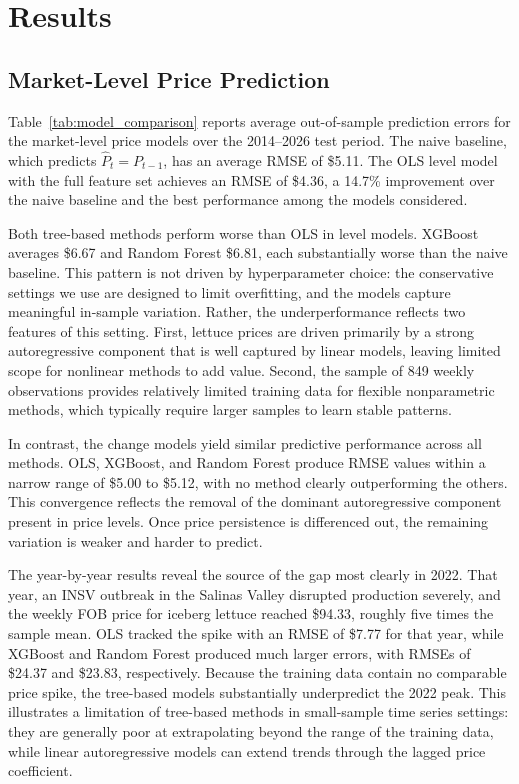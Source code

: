 \documentclass[12pt]{article}
\begin{document}
\section{Results}
\label{sec:results}

\subsection{Market-Level Price Prediction}
\label{subsec:price_prediction}

Table~\ref{tab:model_comparison} reports average out-of-sample prediction errors for the market-level price models over the 2014--2026 test period. The naive baseline, which predicts $\hat{P}_t = P_{t-1}$, has an average RMSE of \$5.11. The OLS level model with the full feature set achieves an RMSE of \$4.36, a 14.7\% improvement over the naive baseline and the best performance among the models considered.

Both tree-based methods perform worse than OLS in level models. XGBoost averages \$6.67 and Random Forest \$6.81, each substantially worse than the naive baseline. This pattern is not driven by hyperparameter choice: the conservative settings we use are designed to limit overfitting, and the models capture meaningful in-sample variation. Rather, the underperformance reflects two features of this setting. First, lettuce prices are driven primarily by a strong autoregressive component that is well captured by linear models, leaving limited scope for nonlinear methods to add value. Second, the sample of 849 weekly observations provides relatively limited training data for flexible nonparametric methods, which typically require larger samples to learn stable patterns.

In contrast, the change models yield similar predictive performance across all methods. OLS, XGBoost, and Random Forest produce RMSE values within a narrow range of \$5.00 to \$5.12, with no method clearly outperforming the others. This convergence reflects the removal of the dominant autoregressive component present in price levels. Once price persistence is differenced out, the remaining variation is weaker and harder to predict.

The year-by-year results reveal the source of the gap most clearly in 2022. That year, an INSV outbreak in the Salinas Valley disrupted production severely, and the weekly FOB price for iceberg lettuce reached \$94.33, roughly five times the sample mean. OLS tracked the spike with an RMSE of \$7.77 for that year, while XGBoost and Random Forest produced much larger errors, with RMSEs of \$24.37 and \$23.83, respectively. Because the training data contain no comparable price spike, the tree-based models substantially underpredict the 2022 peak. This illustrates a limitation of tree-based methods in small-sample time series settings: they are generally poor at extrapolating beyond the range of the training data, while linear autoregressive models can extend trends through the lagged price coefficient.
\end{document}
